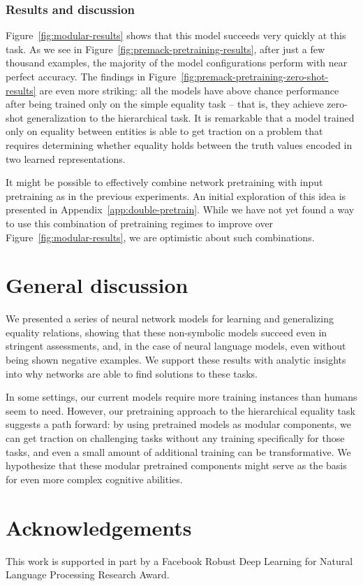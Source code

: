 \documentclass{article}
\newcommand{\Figref}[1]{Figure~\ref{#1}}
\newcommand{\figref}[1]{Figure~\ref{#1}}
\newcommand{\appref}[1]{Appendix~\ref{#1}}
\newcommand{\update}[1]{{\color{darkblue}#1}}
\begin{document}
\subsubsection{Results and discussion}

\update{\Figref{fig:modular-results} shows that this model succeeds very quickly at this task. As we see in \figref{fig:premack-pretraining-results}, after just a few thousand examples, the majority of the model configurations perform with near perfect accuracy. The findings in \figref{fig:premack-pretraining-zero-shot-results} are even more striking: all the models have above chance performance after being trained only on the simple equality task -- that is, they achieve zero-shot generalization to the hierarchical task.} It is remarkable that a model trained only on equality between entities is able to get traction on a problem that requires determining whether equality holds between the truth values encoded in two learned representations.

\update{
It might be possible to effectively combine network pretraining with input pretraining as in the previous experiments. An initial exploration of this idea is presented in \appref{app:double-pretrain}. While we have not yet found a way to use this combination of pretraining regimes to improve over \figref{fig:modular-results}, we are optimistic about such combinations.}


\section{General discussion}

We presented a series of neural network models for learning and generalizing equality relations, showing that these non-symbolic models succeed even in stringent assessments, and, in the case of neural language models, even without being shown negative examples. We support these results with analytic insights into why networks are able to find solutions to these tasks.

In some settings, our current models require more training instances than humans seem to need. However, our pretraining approach to the hierarchical equality task suggests a path forward: by using pretrained models as modular components, we can get traction on challenging tasks without any training specifically for those tasks, and even a small amount of additional training can be transformative.  We hypothesize that these modular pretrained components might serve as the basis for even more complex cognitive abilities.


\section*{Acknowledgements}

\update{This work is supported in part by a Facebook Robust Deep Learning for Natural Language Processing Research Award.}






\end{document}
